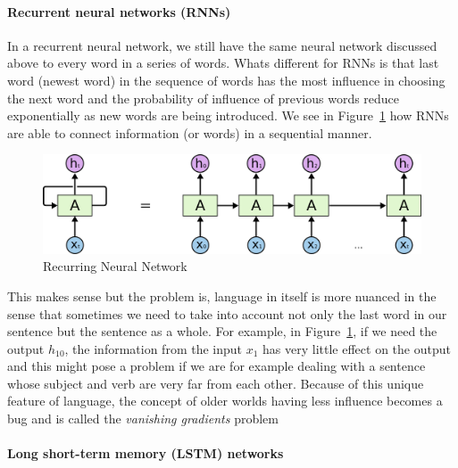 \documentclass[
  letterpaper,
  DIV=11,
  numbers=noendperiod]{scrartcl}
\let\oldparagraph\paragraph
\renewcommand{\paragraph}[1]{\oldparagraph{#1}\mbox{}}
\begin{document}
\hypertarget{recurrent-neural-networks-rnns}{%
\paragraph{Recurrent neural networks
(RNNs)}\label{recurrent-neural-networks-rnns}}

In a recurrent neural network, we still have the same neural network
discussed above to every word in a series of words. Whats different for
RNNs is that last word (newest word) in the sequence of words has the
most influence in choosing the next word and the probability of
influence of previous words reduce exponentially as new words are being
introduced. We see in Figure~\ref{fig-rnn} how RNNs are able to connect
information (or words) in a sequential manner.

\begin{figure}

{\centering \includegraphics{Figures_LLM/rnn.png}

}

\caption{\label{fig-rnn}Recurring Neural Network}

\end{figure}

This makes sense but the problem is, language in itself is more nuanced
in the sense that sometimes we need to take into account not only the
last word in our sentence but the sentence as a whole. For example, in
Figure~\ref{fig-rnn}, if we need the output \(h_{10}\), the information
from the input \(x_1\) has very little effect on the output and this
might pose a problem if we are for example dealing with a sentence whose
subject and verb are very far from each other. Because of this unique
feature of language, the concept of older worlds having less influence
becomes a bug and is called the \emph{vanishing gradients} problem

\hypertarget{long-short-term-memory-lstm-networks}{%
\paragraph{Long short-term memory (LSTM)
networks}\label{long-short-term-memory-lstm-networks}}
\end{document}
